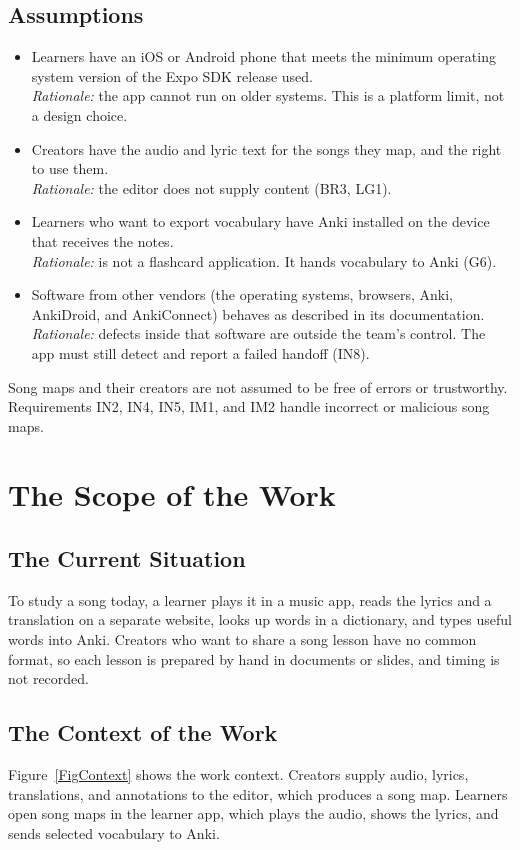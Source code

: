 \documentclass[12pt]{article}
\begin{document}
\subsection{Assumptions}
\begin{itemize}
    \item[A1] Learners have an iOS or Android phone that meets the minimum
    operating system version of the Expo SDK release used.
    \\\textit{Rationale:} the app cannot run on older systems. This is a
    platform limit, not a design choice.
    \item[A2] Creators have the audio and lyric text for the songs they map,
    and the right to use them.
    \\\textit{Rationale:} the editor does not supply content (BR3, LG1).
    \item[A3] Learners who want to export vocabulary have Anki installed on
    the device that receives the notes.
    \\\textit{Rationale:} \progname{} is not a flashcard application. It hands
    vocabulary to Anki (G6).
    \item[A4] Software from other vendors (the operating systems, browsers, Anki,
    AnkiDroid, and AnkiConnect) behaves as described in its documentation.
    \\\textit{Rationale:} defects inside that software are outside the
    team's control. The app must still detect and report a failed handoff
    (IN8).
\end{itemize}

Song maps and their creators are not assumed to be free of errors or trustworthy.
Requirements IN2, IN4, IN5, IM1, and IM2 handle incorrect or malicious song
maps.

\section{The Scope of the Work}
\subsection{The Current Situation}
To study a song today, a learner plays it in a music app, reads the lyrics and
a translation on a separate website, looks up words in a dictionary, and types
useful words into Anki. Creators who want to share a song lesson have no
common format, so each lesson is prepared by hand in documents or slides, and
timing is not recorded.

\subsection{The Context of the Work} \label{SecContext}
Figure~\ref{FigContext} shows the work context. Creators supply audio, lyrics,
translations, and annotations to the editor, which produces a song map.
Learners open song maps in the learner app, which plays the audio, shows the
lyrics, and sends selected vocabulary to Anki.
\end{document}
